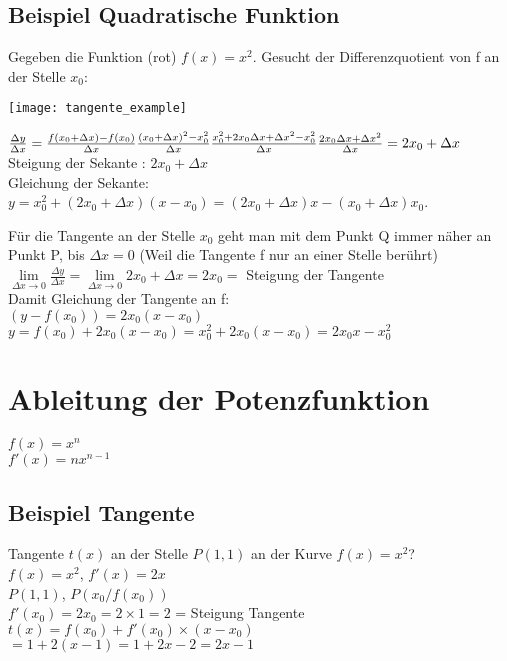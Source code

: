 \documentclass[../main.tex]{subfiles}
\begin{document}
\subsection{Beispiel Quadratische Funktion}
Gegeben die Funktion (rot) $f(x) = x^2$. Gesucht der Differenzquotient von f an der Stelle $x_0$: \\
\begin{minipage}{0.5\textwidth}
    \texttt{[image: tangente\_example]}
\end{minipage} \hfill
\begin{minipage}{0.45\textwidth}
    \begin{math}
        \frac{\Delta y}{\Delta x} = \frac{f(x_0 + \Delta x) - f(x_0)}{\Delta x} \\ [7pt]
        \frac{(x_0 + \Delta x)^2 - x_0^2}{\Delta x} \\ [7pt]
        \frac{x_0^2 + 2x_0\Delta x + \Delta x^2 - x_0^2}{\Delta x} \\ [7pt]
        \frac{2x_0\Delta x + \Delta x^2}{\Delta x} = 2x_0 + \Delta x \\ [7pt]
    \end{math}
    Steigung der Sekante : $2x_0 + \Delta x$ \\ [7pt]
    Gleichung der Sekante: \\ 
    $y = x_0^2 + (2x_0 + \Delta x)(x - x_0) = (2x_0 + \Delta x)x - (x_0 + \Delta x)x_0$. \\ [7pt]
\end{minipage}
Für die Tangente an der Stelle $x_0$ geht man mit dem Punkt Q immer näher an Punkt P, bis $\Delta x = 0$ (Weil die Tangente f nur an einer Stelle berührt) \\ [7pt]
$\lim\limits_{\Delta x\to 0} \frac{\Delta y}{\Delta x} = \lim\limits_{\Delta x\to 0} 2x_0 + \Delta x = 2x_0 = $ Steigung der Tangente \\ [7pt]
Damit Gleichung der Tangente an f: \\ [7pt]
$(y - f(x_0)) = 2x_0(x - x_0)$ \\ [7pt]
$y = f(x_0) + 2x_0(x - x_0) = x_0^2 + 2x_0(x - x_0) = 2x_0x - x_0^2$

\section{Ableitung der Potenzfunktion}
$f(x) = x^n$ \\ [7pt]
$f'(x) = nx^{n-1}$
\subsection{Beispiel Tangente}
Tangente $t(x)$ an der Stelle $P(1,1)$ an der Kurve $f(x)=x^2$? \\ [7pt]
$f(x)=x^2$, $f'(x)=2x$ \\ [7pt]
$P(1,1)$, $P(x_0/f(x_0))$ \\ [7pt]
$f'(x_0) = 2x_0 = 2 \times 1 = 2$ = Steigung Tangente \\ [7pt]
$t(x) = f(x_0) + f'(x_0) \times (x - x_0)$ \\ [7pt]
$= 1 + 2(x - 1) = 1 + 2x -2 = 2x -1$
\end{document}
